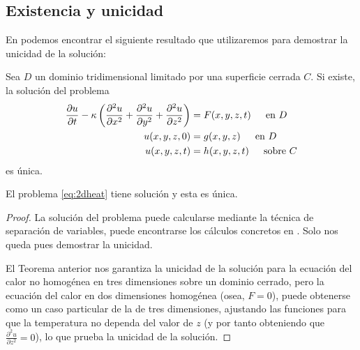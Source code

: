 \subsection{Existencia y unicidad}
En \cite[pg. 66]{2deq} podemos encontrar el siguiente resultado que utilizaremos para demostrar la unicidad de la solución:

\begin{teorema}
	Sea $D$ un dominio tridimensional limitado por una superficie cerrada $C$. Si existe, la solución del problema
	\[
	\begin{split}
		\frac{\partial u}{\partial t} - \kappa \left(\frac{\partial^2 u}{\partial x^2} + \frac{\partial^2 u}{\partial y^2} + \frac{\partial^2 u}{\partial z^2}\right) &= F(x,y,z,t) \hspace{15px} 	\text{en } D \\
		u(x,y,z,0) &= g(x,y,z) \hspace{15px} \text{en } D\\
		u(x,y,z,t) &= h(x,y,z,t) \hspace{15px} \text{sobre } C
	\end{split}
	\]
	es única.
\end{teorema}

\begin{teorema}
	El problema \eqref{eq:2dheat} tiene solución y esta es única.
\end{teorema}
\begin{proof}
	La solución del problema puede calcularse mediante la técnica de separación de variables, puede encontrarse los cálculos concretos en \cite{2dheatexistence}. Solo nos queda pues demostrar la unicidad.
	
	El Teorema anterior nos garantiza la unicidad de la solución para la ecuación del calor no homogénea en tres dimensiones sobre un dominio cerrado, pero la ecuación del calor en dos dimensiones homogénea (osea, $F=0$), puede obtenerse como un caso particular de la de tres dimensiones, ajustando las funciones para que la temperatura no dependa del valor de $z$ (y por tanto obteniendo que $\frac{\partial^2u}{\partial z^2}=0$), lo que prueba la unicidad de la solución.
\end{proof}


